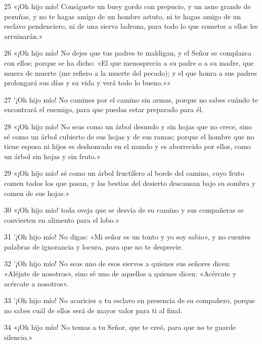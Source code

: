\par 25 «¡Oh hijo mío! Consíguete un buey gordo con prepucio, y un asno grande de pezuñas, y no te hagas amigo de un hombre astuto, ni te hagas amigo de un esclavo pendenciero, ni de una sierva ladrona, para todo lo que cometes a ellos les arruinarán.»

\par 26 «¡Oh hijo mío! No dejes que tus padres te maldigan, y el Señor se complazca con ellos; porque se ha dicho: «El que menosprecia a su padre o a su madre, que muera de muerte (me refiero a la muerte del pecado); y el que honra a sus padres prolongará sus días y su vida y verá todo lo bueno.»»

\par 27 '¡Oh hijo mío! No camines por el camino sin armas, porque no sabes cuándo te encontrará el enemigo, para que puedas estar preparado para él.

\par 28 «¡Oh hijo mío! No seas como un árbol desnudo y sin hojas que no crece, sino sé como un árbol cubierto de sus hojas y de sus ramas; porque el hombre que no tiene esposa ni hijos es deshonrado en el mundo y es aborrecido por ellos, como un árbol sin hojas y sin fruto.»

\par 29 «¡Oh hijo mío! sé como un árbol fructífero al borde del camino, cuyo fruto comen todos los que pasan, y las bestias del desierto descansan bajo su sombra y comen de sus hojas.»

\par 30 «¡Oh hijo mío! toda oveja que se desvía de su camino y sus compañeras se convierten en alimento para el lobo.»

\par 31 '¡Oh hijo mío! No digas: «Mi señor es un tonto y yo soy sabio», y no cuentes palabras de ignorancia y locura, para que no te desprecie.

\par 32 '¡Oh hijo mío! No seas uno de esos siervos a quienes sus señores dicen: «Aléjate de nosotros», sino sé uno de aquellos a quienes dicen: «Acércate y acércate a nosotros».

\par 33 '¡Oh hijo mío! No acaricies a tu esclavo en presencia de su compañero, porque no sabes cuál de ellos será de mayor valor para ti al final.

\par 34 «¡Oh hijo mío! No temas a tu Señor, que te creó, para que no te guarde silencio.»


